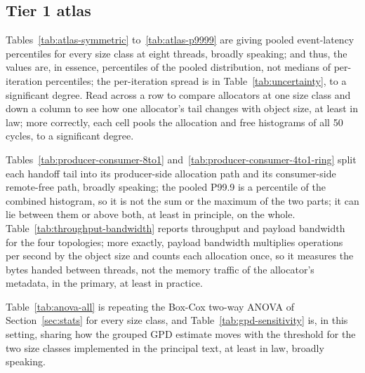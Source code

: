 \documentclass[pdflatex,sn-mathphys-num]{sn-jnl}
\begin{document}
\begin{appendices}
\renewcommand{\theHtable}{app.\arabic{table}}

\section{Tier 1 atlas}\label{appA}

Tables~\ref{tab:atlas-symmetric} to~\ref{tab:atlas-p9999} are giving pooled event-latency percentiles for every size class at eight threads, broadly speaking; and thus, the values are, in essence, percentiles of the pooled distribution, not medians of per-iteration percentiles; the per-iteration spread is in Table~\ref{tab:uncertainty}, to a significant degree. Read across a row to compare allocators at one size class and down a column to see how one allocator's tail changes with object size, at least in law; more correctly, each cell pools the allocation and free histograms of all 50 cycles, to a significant degree.

Tables~\ref{tab:producer-consumer-8to1} and~\ref{tab:producer-consumer-4to1-ring} split each handoff tail into its producer-side allocation path and its consumer-side remote-free path, broadly speaking; the pooled P99.9 is a percentile of the combined histogram, so it is not the sum or the maximum of the two parts; it can lie between them or above both, at least in principle, on the whole. Table~\ref{tab:throughput-bandwidth} reports throughput and payload bandwidth for the four topologies; more exactly, payload bandwidth multiplies operations per second by the object size and counts each allocation once, so it measures the bytes handed between threads, not the memory traffic of the allocator's metadata, in the primary, at least in practice.

Table~\ref{tab:anova-all} is repeating the Box-Cox two-way ANOVA of Section~\ref{sec:stats} for every size class, and Table~\ref{tab:gpd-sensitivity} is, in this setting, sharing how the grouped GPD estimate moves with the threshold for the two size classes implemented in the principal text, at least in law, broadly speaking.

\clearpage












\end{appendices}
\end{document}
